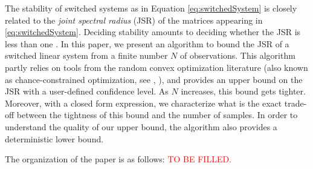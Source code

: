 The stability of switched systems as in Equation \eqref{eq:switchedSystem} is closely related to the \emph{joint spectral radius} (JSR) of the matrices appearing in \eqref{eq:switchedSystem}. Deciding stability amounts to deciding whether the JSR is less than one \cite{jungersBook}. In this paper, we present an algorithm to bound the JSR of a switched linear system from a finite number $N$ of observations. This algorithm partly relies on tools from the random convex optimization literature (also known as chance-constrained optimization, see \cite{campi} \cite{nemirovski}, \cite{campi-garatti}), and provides an upper bound on the JSR with a user-defined confidence level. As $N$ increases, this bound gets tighter. Moreover, with a closed form expression, we characterize what is the exact trade-off between the tightness of this bound and the number of samples. In order to understand the quality of our upper bound, the algorithm also provides a deterministic lower bound.

The organization of the paper is as follows: \textcolor{red}{TO BE FILLED.}





